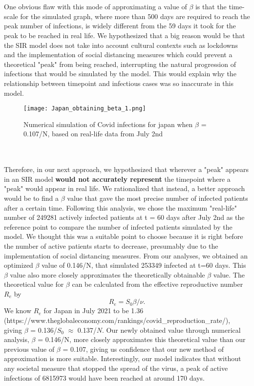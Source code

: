 \documentclass[11pt]{article}
\theoremstyle{definition}
\begin{document}
{\\
\\
One obvious flaw with this mode of approximating a value of $\beta$ is that the time-scale for the simulated graph, where more than 500 days are required to reach the peak number of infections, is widely different from the 59 days it took for the peak to be reached in real life. We hypothesized that a big reason would be that the SIR model does not take into account cultural contexts such as lockdowns and the implementation of social distancing measures which could prevent a theoretical "peak" from being reached, interrupting the natural progression of infections that would be simulated by the model. This would explain why the relationship between timepoint and infectious cases was so inaccurate in this model. 
\\
\begin{figure}[htp]
\centering
    \texttt{[image: Japan\_obtaining\_beta\_1.png]}
    \caption{Numerical simulation of Covid infections for japan when $\beta$ = 0.107/N, based on real-life data from July 2nd}
\end{figure}\\
\\
Therefore, in our next approach, we hypothesized that wherever a "peak" appears in an SIR model \textbf{would not accurately represent} the timepoint where a "peak" would appear in real life. We rationalized that instead, a better approach would be to find a $\beta$ value that gave the most precise number of infected patients after a certain time. Following this analysis, we chose the maximum "real-life" number of 249281 actively infected patients at t = 60 days after July 2nd as the reference point to compare the number of infected patients simulated by the model. We thought this was a suitable point to choose because it is right before the number of active patients starts to decrease, presumably due to the implementation of social distancing measures. From our analyses, we obtained an optimized $\beta$ value of 0.146/N, that simulated 253349 infected at t=60 days. This $\beta$ value also more closely approximates the theoretically obtainable $\beta$ value. The theoretical value for $\beta$ can be calculated from the effective reproductive number $R_{e}$ by 
$$R_{e} = S_{0}\beta/\nu. $$
We know $R_{e}$ for Japan in July 2021 to be 1.36 (https://www.theglobaleconomy.com/rankings/covid_reproduction_rate/),
\\
giving $\beta$ = 0.136/$S_{0}$ $\approx$ 0.137/$N$. Our newly obtained value through numerical analysis, $\beta$ = 0.146/N, more closely approximates this theoretical value than our previous value of $\beta$ = 0.107, giving us confidence that our new method of approximation is more suitable. Interestingly, our model indicates that without any societal measure that stopped the spread of the virus, a peak of active infections of 6815973 would have been reached at around 170 days.
}
\end{document}
